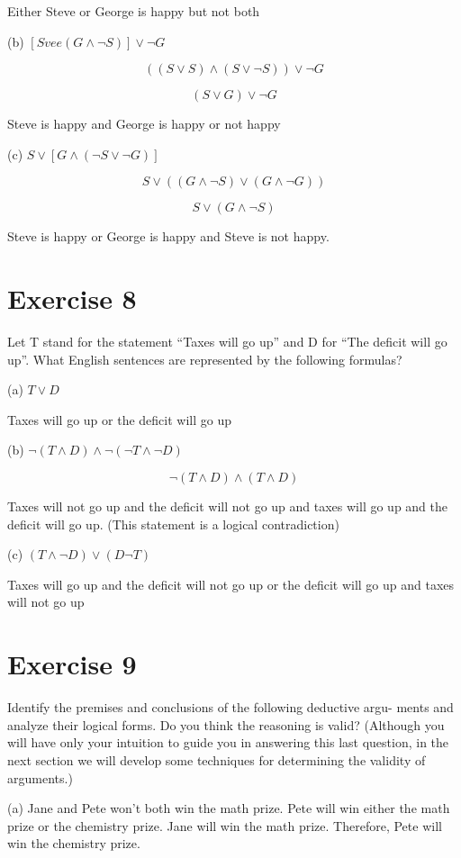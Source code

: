 \documentclass[11pt]{article}
\begin{document}
Either Steve or George is happy but not both

\noindent (b) $ [S vee ( G \wedge \neg S)] \vee \neg G $

$$((S \vee S) \wedge (S \vee \neg S)) \vee \neg G $$

$$ (S \vee G) \vee \neg G $$

Steve is happy and George is happy or not happy

\noindent (c) $ S \vee [G \wedge (\neg S \vee \neg G)] $

$$ S \vee ((G \wedge \neg S) \vee (G \wedge \neg G)) $$

$$ S \vee (G \wedge \neg S) $$

Steve is happy or George is happy and Steve is not happy.

\section*{Exercise 8}
Let T stand for the statement ``Taxes will go up'' and D for ``The deficit will go up''. What English sentences are represented by the following formulas?

\noindent (a) $ T \vee D $

Taxes will go up or the deficit will go up

\noindent (b) $ \neg (T \wedge D) \wedge \neg (\neg T \wedge \neg D) $

$$ \neg (T \wedge D) \wedge (T \wedge D) $$

Taxes will not go up and the deficit will not go up and taxes will go up and the deficit will go up. (This statement is a logical contradiction)

\noindent (c) $ (T \wedge \neg D) \vee (D \neg T) $

Taxes will go up and the deficit will not go up or the deficit will go up and taxes will not go up

\section*{Exercise 9}
Identify the premises and conclusions of the following deductive argu-
ments and analyze their logical forms. Do you think the reasoning is valid?
(Although you will have only your intuition to guide you in answering
this last question, in the next section we will develop some techniques for
determining the validity of arguments.)

\noindent (a) Jane and Pete won't both win the math prize. Pete will win either the math prize or the chemistry prize. Jane will win the math prize. Therefore, Pete will win the chemistry prize.
\end{document}
